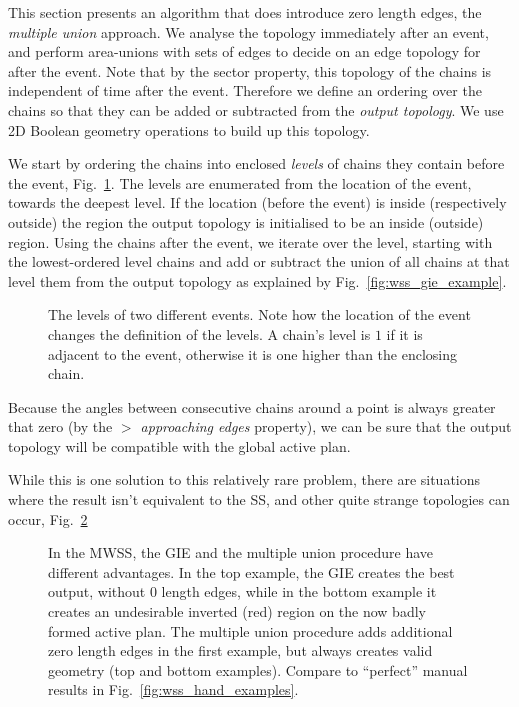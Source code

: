 This section presents an algorithm that does introduce zero length edges, the \emph{multiple union} approach. We analyse the topology immediately after an event, and perform area-unions with sets of edges to decide on an edge topology for after the event. Note that by the sector property, this topology of the chains is independent of time after the event. Therefore we define an ordering over the chains so that they can be added or subtracted from the \emph{output topology}. We use 2D Boolean geometry operations to build up this topology.

We start by ordering the chains into enclosed \emph{levels} of chains they contain before the event, Fig.~\ref{fig:wss_numbered_union}. The levels are enumerated from the location of the event, towards the deepest level. If the location (before the event) is inside (respectively outside) the region the output topology is initialised to be an inside (outside) region. Using the chains after the event, we iterate over the level, starting with the lowest-ordered level chains and add or subtract the union of all chains at that level them from the output topology as explained by Fig.~\ref{fig:wss_gie_example}. 

\begin{figure}
  \centering
  \def\svgwidth{1.0\columnwidth}
  
  \caption[Identify the level of chains]{\label{fig:wss_numbered_union} The levels of two different events. Note how the location of the event changes the definition of the levels. A chain's level is $1$ if it is adjacent to the event, otherwise it is one higher than the enclosing chain.}
\end{figure}

Because the angles between consecutive chains around a point is always greater that zero (by the \emph{$>$ approaching edges} property), we can be sure that the output topology will be compatible with the global active plan.

While this is one solution to this relatively rare problem, there are situations where the result isn't equivalent to the SS, and other quite strange topologies can occur, Fig.~\ref{fig:wss_union_vs_gie}

\begin{figure}
  \centering
  \def\svgwidth{1.0\columnwidth}
  
  \caption[A comparison of the GIE and multiple union procedure]{\label{fig:wss_union_vs_gie} In the MWSS, the GIE and the multiple union procedure  have different advantages. In the top example, the GIE creates the best output, without 0 length edges, while in the bottom example it creates an undesirable inverted (red) region on the now badly formed active plan. The multiple union procedure adds additional zero length edges in the first example, but always creates valid geometry (top and bottom examples). Compare to ``perfect'' manual results in Fig.~\ref{fig:wss_hand_examples}.}
\end{figure}

